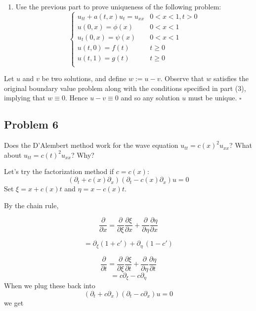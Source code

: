 \documentclass[
]{article}
\providecommand{\tightlist}{%
  \setlength{\itemsep}{0pt}\setlength{\parskip}{0pt}}
\begin{document}
\begin{enumerate}
\def\labelenumi{(\arabic{enumi})}
\setcounter{enumi}{3}
\tightlist
\item
  Use the previous part to prove uniqueness of the following problem:
  \begin{equation} 
  \begin{cases}
    u_{tt}+a(t,x)u_t=u_{xx} & 0<x<1, t>0 \\
    u(0,x)=\phi(x) & 0<x<1 \\
    u_t(0,x)=\psi(x) & 0<x<1 \\
    u(t,0) = f(t) & t \geq 0 \\
    u(t,1) = g(t) & t \geq 0 \\
  \end{cases}
  \end{equation}
\end{enumerate}

Let \(u\) and \(v\) be two solutions, and define \(w:=u-v\). Observe
that \(w\) satisfies the original boundary value problem along with the
conditions specified in part (3), implying that \(w \equiv 0\). Hence
\(u-v\equiv 0\) and so any solution \(u\) must be unique. \(\square\)

\hypertarget{problem-6}{%
\subsection{Problem 6}\label{problem-6}}

Does the D'Alembert method work for the wave equation
\(u_{tt} = c(x)^2u_{xx}\)? What about \(u_{tt} = c(t)^2u_{xx}\)? Why?

Let's try the factorization method if \(c=c(x)\):
\[\left( \partial_{t}+c(x)\partial_{x}\right) \left(\partial_{t}-c(x)\partial_{x}\right)u=0\]
Set \(\xi=x+c(x)t\) and \(\eta=x-c(x)t\).

By the chain rule,

\[\frac{\partial}{\partial x} = \frac{\partial}{\partial \xi} \frac{\partial \xi}{\partial x}+\frac{\partial}{\partial\eta}\frac{\partial\eta}{\partial x}\]

\[=\partial_{\xi}(1+c')+\partial_{\eta}\,(1-c')\]

\[\frac{\partial}{\partial t} = \frac{\partial}{\partial \xi} \frac{\partial \xi}{\partial t}+\frac{\partial }{\partial\eta}\frac{\partial\eta}{\partial t}\]
\[=c\partial_{\xi}-c\partial_{\eta}\] When we plug these back into
\[\left( \partial_{t}+c\partial_{x}\right) \left(\partial_{t}-c\partial_{x}\right)u=0\]
we get
\end{document}
